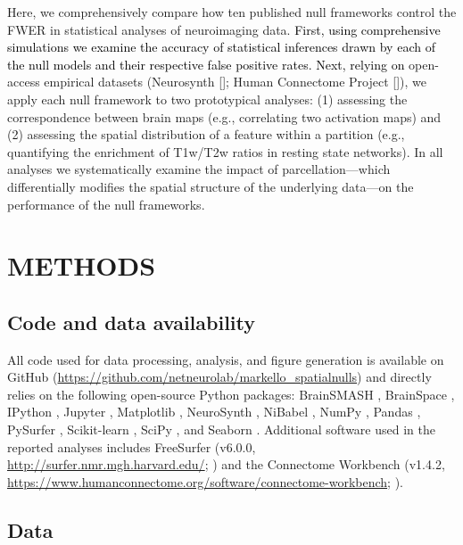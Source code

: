 \documentclass[12pt,aps,pra,reprint,showkeys]{revtex4-1}
\newcommand{\nimg}[1]{\textcolor{black}{{#1}}}
\begin{document}
Here, we comprehensively compare how ten published null frameworks control the FWER in statistical analyses of neuroimaging data.
\nimg{First, using comprehensive simulations we examine the accuracy of statistical inferences drawn by each of the null models and their respective false positive rates.
Next, relying on} open-access empirical datasets (Neurosynth [\citealt{yarkoni2011natmethods}]; Human Connectome Project [\citealt{vanessen2013neuroimage}]), we apply each null framework to two prototypical analyses: (1) assessing the correspondence between brain maps (e.g., correlating two activation maps) and (2) assessing the spatial distribution of a feature within a partition (e.g., quantifying the enrichment of T1w/T2w ratios in resting state networks).
In all analyses we systematically examine the impact of parcellation---which differentially modifies the spatial structure of the underlying data---on the performance of the null frameworks.

\section*{METHODS}

\subsection*{Code and data availability}

All code used for data processing, analysis, and figure generation is available on GitHub (\url{https://github.com/netneurolab/markello_spatialnulls}) and directly relies on the following open-source Python packages: BrainSMASH \citep{burt2020neuroimage}, BrainSpace \citep{vosdewael2020brainspace}, IPython \citep{ipython}, Jupyter \citep{jupyter}, Matplotlib \citep{matplotlib}, NeuroSynth \citep{yarkoni2011natmethods}, NiBabel \citep{nibabel}, NumPy \citep{numpyv1, numpyv2}, Pandas \citep{pandas}, PySurfer \citep{pysurfer}, Scikit-learn \citep{sklearn}, SciPy \citep{scipy}, and Seaborn \citep{seaborn}.
Additional software used in the reported analyses includes FreeSurfer (v6.0.0, \url{http://surfer.nmr.mgh.harvard.edu/}; \citealt{fischl1999humanbrainmap}) and the Connectome Workbench (v1.4.2, \url{https://www.humanconnectome.org/software/connectome-workbench}; \citealt{marcus2011frontiers}).

\subsection*{Data}
\end{document}
